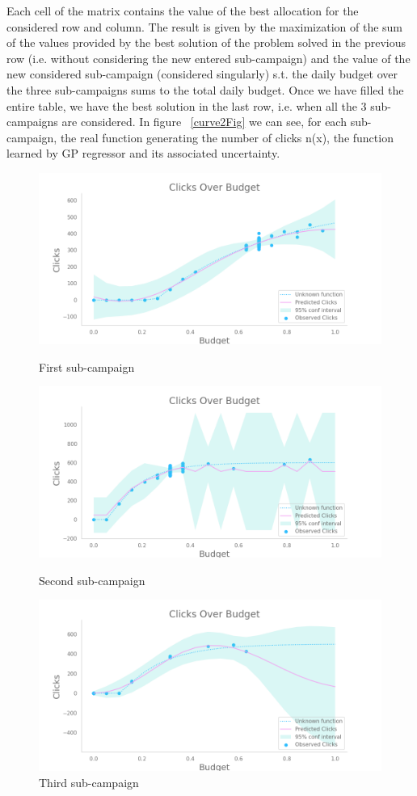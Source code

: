 Each cell of the matrix contains the value of the best allocation for the considered row and column.
The result is given by the maximization of the sum of the values provided by the best solution of the problem solved in the previous row (i.e. without considering the new entered sub-campaign) and 
the value of the new considered sub-campaign (considered singularly) s.t. the daily budget over the three sub-campaigns sums to the total daily budget.
Once we have filled the entire table, we have the best solution in the last row, i.e. when all the 3 sub-campaigns are considered.
In figure ~\ref{curve2Fig} we can see, for each sub-campaign, the real function generating the number of clicks n(x), the function learned by GP regressor and its associated uncertainty.
\begin{figure}[!htb]
	\centering

  		\includegraphics[width=\linewidth]{images/part2_bidding_curve_subcamaign_0.png}
  		\caption{First sub-campaign}  		
	\endminipage\hfill
  		\includegraphics[width=\linewidth]{images/part2_bidding_curve_subcamaign_1.png}
  		\caption{Second sub-campaign} 
	\endminipage\hfill
  		\includegraphics[width=\linewidth]{images/part2_bidding_curve_subcamaign_2.png}
  		\caption{Third sub-campaign}
	\endminipage\hfill
	

\end{figure}
